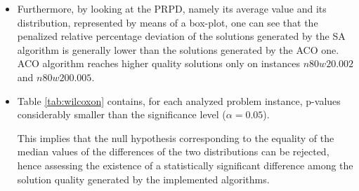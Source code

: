 \begin{itemize}
\item Furthermore, by looking at the PRPD, namely its average value and its distribution, represented by means of a box-plot, one can see that the penalized relative percentage deviation of the solutions generated by the SA algorithm is generally lower than the solutions generated by the ACO one.
ACO algorithm reaches higher quality solutions only on instances $n80w20.002$ and $n80w200.005$.


      



\item Table \ref{tab:wilcoxon} contains, for each analyzed problem instance, p-values considerably smaller than the significance level ($\alpha=0.05$). 

This implies that the null hypothesis corresponding to the equality of the median values of the differences of the two distributions can be rejected, hence assessing the existence of a statistically significant difference among the solution quality generated by the implemented algorithms.


\end{itemize}

